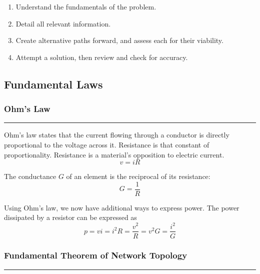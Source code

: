 \documentclass{article}
\begin{document}
    \vspace{.2em}\noindent

    \begin{enumerate}[label=\arabic*.]
        \item Understand the fundamentals of the problem.
        \item Detail all relevant information.
        \item Create alternative paths forward, and assess each for their viability.
        \item Attempt a solution, then review and check for accuracy.
    \end{enumerate}


    \pagebreak
    \begin{center}
        \subsection*{Fundamental Laws}
    \end{center}

    \medskip
    \subsubsection*{Ohm's Law}
    \vspace{-1em}
    \rule{\linewidth}{0.1mm}

    \vspace{.2em}\noindent
    Ohm's law states that the current flowing through a conductor is directly proportional to the voltage across it.
    Resistance is that constant of proportionality.
    Resistance is a material's opposition to electric current.
    \[
        v=iR
    \]

    \vspace{.2em}\noindent
    The conductance $G$ of an element is the reciprocal of its resistance:
    \[
        G = \frac{1}{R}
    \]

    \vspace{.2em}\noindent
    Using Ohm's law, we now have additional ways to express power.
    The power dissipated by a resistor can be expressed as
    \[
        p=vi=i^2 R=\frac{v^2}{R}=v^2 G=\frac{i^2}{G}
    \]

    \smallskip
    \subsubsection*{Fundamental Theorem of Network Topology}
    \vspace{-1em}
    \rule{\linewidth}{0.1mm}
\end{document}
